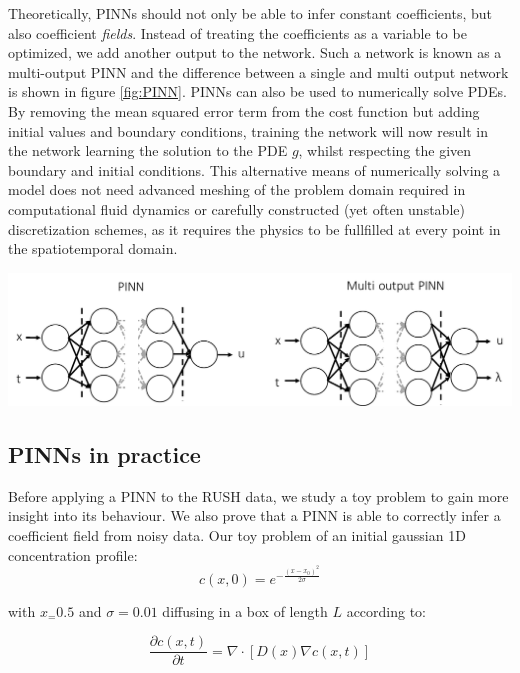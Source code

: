 \documentclass{Dissertate}
\let\origfigure\figure
\let\endorigfigure\endfigure
\renewenvironment{figure}[1][2] {
    \expandafter\origfigure\expandafter[H]
} {
    \endorigfigure
}
\begin{document}
Theoretically, PINNs should not only be able to infer constant
coefficients, but also coefficient \emph{fields}. Instead of treating
the coefficients as a variable to be optimized, we add another output to
the network. Such a network is known as a multi-output PINN and the
difference between a single and multi output network is shown in figure
\ref{fig:PINN}. PINNs can also be used to numerically solve PDEs.
By removing the mean squared error term from the cost function but
adding initial values and boundary conditions, training the network will
now result in the network learning the solution to the PDE \(g\), whilst
respecting the given boundary and initial conditions. This alternative
means of numerically solving a model does not need advanced meshing of
the problem domain required in computational fluid dynamics or carefully
constructed (yet often unstable) discretization schemes, as it requires
the physics to be fullfilled at every point in the spatiotemporal
domain.

\begin{figure}
\hypertarget{fig:PINN}{%
\centering
\includegraphics{source/figures/pdf/PINN.pdf}
\caption{\textbf{Left panel:} a single output PINN. \textbf{Right
panel:} A multi-output PINN. The network now also predicts the
coefficients values at each data point.}\label{fig:PINN}
}
\end{figure}

\hypertarget{pinns-in-practice}{%
\subsection{PINNs in practice}\label{pinns-in-practice}}

Before applying a PINN to the RUSH data, we study a toy problem to gain
more insight into its behaviour. We also prove that a PINN is able to
correctly infer a coefficient field from noisy data. Our toy problem of
an initial gaussian 1D concentration profile: \[
c(x, 0) = e^{-\frac{(x-x_0)^2}{2\sigma}}
\]

with \(x_ = 0.5\) and \(\sigma =0.01\) diffusing in a box of length
\(L\) according to:

\begin{equation}
\frac{\partial c(x,t)}{\partial t} = \nabla \cdot[D(x)\nabla c(x,t)]
\label{eq:toyproblem}\end{equation}
\end{document}
